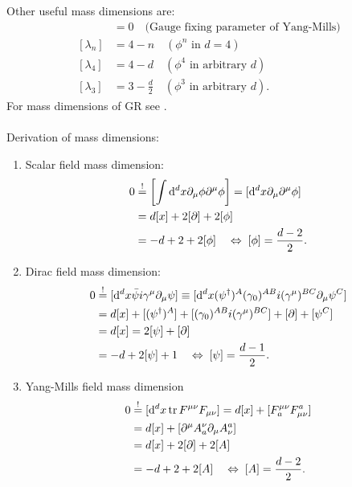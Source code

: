 Other useful mass dimensions are:
\begin{align}
	[\frac{1}{\xi}] &=0\quad  \text{(Gauge fixing parameter of Yang-Mills)}\\
	[\lambda_n] &= 4-n \quad (\phi^n \text{ in } d=4)\\
	[\lambda_4] &= 4-d \quad (\phi^4 \text{ in arbitrary } d)\\
	[\lambda_3] &= 3-\frac{d}{2} \quad (\phi^3 \text{ in arbitrary } d).
\end{align}
For mass dimensions of GR see .\\
\\
Derivation of mass dimensions:
\begin{enumerate}
	\item Scalar field mass dimension:
	\begin{align*}
		0 &\stackrel{!}{=} \left[\int \mathrm{d}^d x \partial_\mu \phi \partial^\mu \phi\right] = [\mathrm{d}^d x \partial_\mu \partial^\mu \phi]\\
		&= d [x] + 2 [\partial] + 2 [\phi] \\
		&= -d +2 +2 [\phi] \quad \Leftrightarrow\; [\phi] = \frac{d-2}{2}.
	\end{align*}
\item Dirac  field mass dimension:
\begin{align*}
	0&\stackrel{!}{=} [\mathrm{d}^d x \bar{\psi} i \gamma^\mu \partial_\mu \psi] \equiv [\mathrm{d}^d x (\psi^\dagger)^A (\gamma_0)^{AB} i (\gamma^\mu)^{BC} \partial_\mu \psi^C]\\
	&= d[x] + [(\psi^\dagger)^A]+ [(\gamma_0)^{AB} i (\gamma^\mu)^{BC} ] + [\partial] + [\psi^C] \\
	&= d [x] = 2 [\psi] + [\partial] \\
	&= -d +2 [\psi] +1 \quad \Leftrightarrow \; [\psi] = \frac{d-1}{2}.
\end{align*}
\item Yang-Mills field mass dimension
\begin{align*}
	0&\stackrel{!}{=} [\mathrm{d}^d x \tr F^{\mu \nu} F_{\mu \nu}] = d[x] + [F^{\mu \nu}_a F^a_{\mu \nu}] \\
	&= d[x] + [\partial^\mu A^\nu_a \partial_\mu A^a_\nu] \\
	&= d [x] + 2[\partial] + 2 [A] \\
	&=-d +2 +2 [A] \quad \Leftrightarrow \; [A] = \frac{d-2}{2}.
\end{align*}
\end{enumerate}


